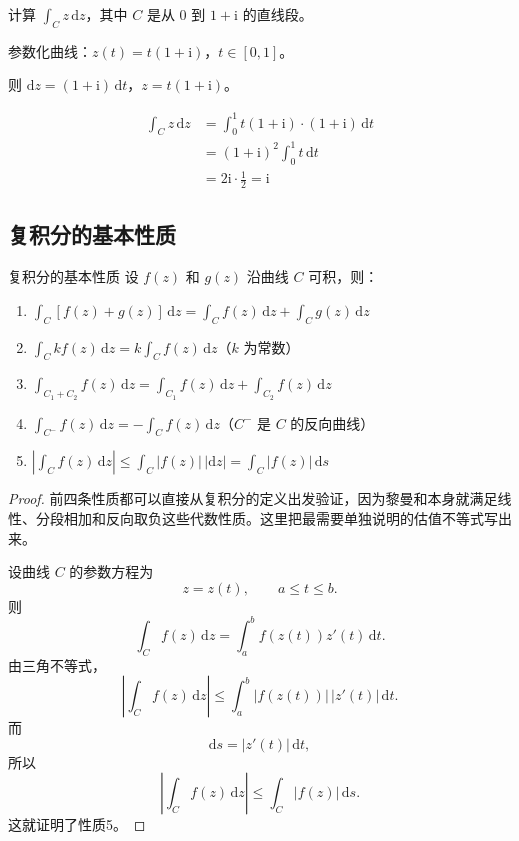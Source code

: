 \begin{lizi}{}{}
计算 $\displaystyle\int_C z\,\mathrm{d}z$，其中 $C$ 是从 $0$ 到 $1 + \mathrm{i}$ 的直线段。

\begin{jie}
    参数化曲线：$z(t) = t(1 + \mathrm{i})$，$t \in [0, 1]$。
    
    则 $\mathrm{d}z = (1 + \mathrm{i})\,\mathrm{d}t$，$z = t(1 + \mathrm{i})$。
    
    \begin{align}
        \int_C z\,\mathrm{d}z &= \int_0^1 t(1 + \mathrm{i}) \cdot (1 + \mathrm{i})\,\mathrm{d}t \\
        &= (1 + \mathrm{i})^2 \int_0^1 t\,\mathrm{d}t \\
        &= 2\mathrm{i} \cdot \frac{1}{2} = \mathrm{i}
    \end{align}
\end{jie}
\end{lizi}

\subsection{复积分的基本性质}

\begin{dingli}{复积分的基本性质}{}
设 $f(z)$ 和 $g(z)$ 沿曲线 $C$ 可积，则：
\begin{enumerate}
    \item $\displaystyle\int_C [f(z) + g(z)]\,\mathrm{d}z = \int_C f(z)\,\mathrm{d}z + \int_C g(z)\,\mathrm{d}z$
    \item $\displaystyle\int_C kf(z)\,\mathrm{d}z = k\int_C f(z)\,\mathrm{d}z$（$k$ 为常数）
    \item $\displaystyle\int_{C_1 + C_2} f(z)\,\mathrm{d}z = \int_{C_1} f(z)\,\mathrm{d}z + \int_{C_2} f(z)\,\mathrm{d}z$
    \item $\displaystyle\int_{C^-} f(z)\,\mathrm{d}z = -\int_C f(z)\,\mathrm{d}z$（$C^-$ 是 $C$ 的反向曲线）
    \item $\displaystyle\left|\int_C f(z)\,\mathrm{d}z\right| \leq \int_C |f(z)|\,|\mathrm{d}z| = \int_C |f(z)|\,\mathrm{d}s$
\end{enumerate}
\end{dingli}

\begin{proof}
前四条性质都可以直接从复积分的定义出发验证，因为黎曼和本身就满足线性、分段相加和反向取负这些代数性质。这里把最需要单独说明的估值不等式写出来。

设曲线 $C$ 的参数方程为
\[
    z=z(t),\qquad a\le t\le b.
\]
则
\[
    \int_C f(z)\,\mathrm{d}z = \int_a^b f(z(t))z'(t)\,\mathrm{d}t.
\]
由三角不等式，
\[
    \left|\int_C f(z)\,\mathrm{d}z\right|
    \leq \int_a^b |f(z(t))|\,|z'(t)|\,\mathrm{d}t.
\]
而
\[
    \mathrm{d}s = |z'(t)|\,\mathrm{d}t,
\]
所以
\[
    \left|\int_C f(z)\,\mathrm{d}z\right|
    \leq \int_C |f(z)|\,\mathrm{d}s.
\]
这就证明了性质5。
\end{proof}

